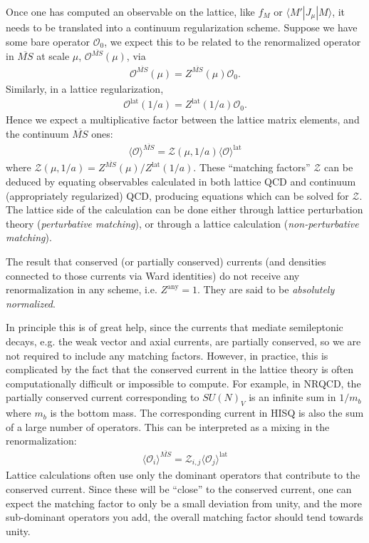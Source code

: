 Once one has computed an observable on the lattice, like $f_M$ or $\langle M' | J_{\mu} | M\rangle$, it needs to be translated into a continuum regularization scheme. Suppose we have some bare operator $\mathcal{O}_0$, we expect this to be related to the renormalized operator in $\overline{MS}$ at scale $\mu$, $\mathcal{O}^{\overline{MS}}(\mu)$, via
\begin{align}
  \mathcal{O}^{\overline{MS}}(\mu) = Z^{\overline{MS}}(\mu) \mathcal{O}_0.
\end{align}
Similarly, in a lattice regularization,
\begin{align}
  \mathcal{O}^{\text{lat}}(1/a) = Z^{\text{lat}}(1/a) \mathcal{O}_0.
\end{align}
Hence we expect a multiplicative factor between the lattice matrix elements, and the continuum $\overline{MS}$ ones:
\begin{align}
  \langle \mathcal{O} \rangle^{\overline{MS}} = \mathcal{Z}(\mu,1/a) \langle \mathcal{O} \rangle^{\text{lat}}
\end{align}
where $\mathcal{Z}(\mu,1/a) = Z^{\overline{MS}}(\mu)/Z^{\text{lat}}(1/a)$. These ``matching factors'' $\mathcal{Z}$ can be deduced by equating observables calculated in both lattice QCD and continuum (appropriately regularized) QCD, producing equations which can be solved for $\mathcal{Z}$. The lattice side of the calculation can be done either through lattice perturbation theory ({\it{perturbative matching}}), or through a lattice calculation ({\it{non-perturbative matching}}).

The result that conserved (or partially conserved) currents (and densities connected to those currents via Ward identities) do not receive any renormalization in any scheme, i.e. $Z^{\text{any}}=1$. They are said to be {\it{absolutely normalized}}.

In principle this is of great help, since the currents that mediate semileptonic decays, e.g. the weak vector and axial currents, are partially conserved, so we are not required to include any matching factors. However, in practice, this is complicated by the fact that the conserved current in the lattice theory is often computationally difficult or impossible to compute. For example, in NRQCD, the partially conserved current corresponding to $SU(N)_V$ is an infinite sum in $1/m_b$ where $m_b$ is the bottom mass. The corresponding current in HISQ is also the sum of a large number of operators. This can be interpreted as a mixing in the renormalization:
\begin{align}
  \langle \mathcal{O}_i \rangle^{\overline{MS}} = \mathcal{Z}_{i,j} \langle \mathcal{O}_j \rangle^{\text{lat}}
\end{align}
Lattice calculations often use only the dominant operators that contribute to the conserved current. Since these will be ``close'' to the conserved current, one can expect the matching factor to only be a small deviation from unity, and the more sub-dominant operators you add, the overall matching factor should tend towards unity.
